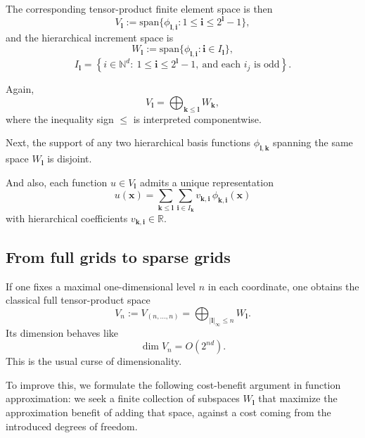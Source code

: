 The corresponding tensor-product finite element space is then
$$
V_\mathbf{l} := \mathrm{span}\{\phi_{\mathbf{l},\mathbf{i}}: 1\le \mathbf{i} \le 2^\mathbf{l}-1\},
$$
and the hierarchical increment space is
$$
W_\mathbf{l} := \mathrm{span}\{\phi_{\mathbf{l},\mathbf{i}}: \mathbf{i}\in I_\mathbf{l}\},
$$
$$
I_\mathbf{l}
=
\left\{
i\in\mathbb{N}^d:\ 1\le \mathbf{i} \le 2^\mathbf{l}-1,\ \text{and each } i_j \text{ is odd}
\right\}.
$$

Again,
$$
V_\mathbf{l} = \bigoplus_{\mathbf{k}\le \mathbf{l}} W_\mathbf{k},
$$
where the inequality sign $\le$ is interpreted componentwise.

Next, the support of any two hierarchical basis functions $\phi_{\mathbf{l}, \mathbf{k}}$
spanning the same space $W_\mathbf{l}$ is disjoint.

And also, each function $u\in V_\mathbf{l}$ admits a unique representation
$$
u(\mathbf{x})
=
\sum_{\mathbf{k}\le \mathbf{l}} \sum_{\mathbf{i}\in I_\mathbf{k}}
v_{
    \mathbf{k},
    \mathbf{i}
}\,\phi_{
    \mathbf{k},
    \mathbf{i}
}(\mathbf{x})
$$
with hierarchical coefficients $v_{\mathbf{k},\mathbf{i}}\in\mathbb{R}$.


\subsection{From full grids to sparse grids}

If one fixes a maximal one-dimensional level $n$ in each coordinate, one obtains the classical full tensor-product space
$$
V_n := V_{(n,\dots, n)}
=
\bigoplus_{|\mathbf l|_\infty\le n} W_\mathbf{l}.
$$
Its dimension behaves like
$$
\dim V_n = O(2^{nd}).
$$
This is the usual curse of dimensionality.

To improve this, we formulate the following cost-benefit argument in
function approximation:
we seek a finite collection of subspaces $W_\mathbf{l}$ that
maximize the approximation benefit of adding that space, against a cost
coming from the introduced degrees of freedom.

%

